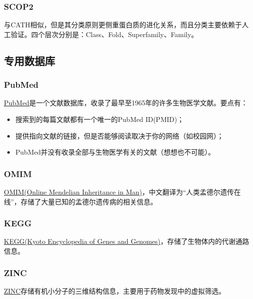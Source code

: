 \subsubsection{SCOP2}

与CATH相似，但是其分类原则更侧重蛋白质的进化关系，而且分类主要依赖于人工验证。四个层次分别是：Class、Fold、Superfamily、Family。

\subsection{专用数据库}

\subsubsection{PubMed}

\href{https://pubmed.ncbi.nlm.nih.gov/}{PubMed}是一个文献数据库，收录了最早至1965年的许多生物医学文献。要点有：

\begin{itemize}
	\item 搜索到的每篇文献都有一个唯一的PubMed ID(PMID)；
	\item 提供指向文献的链接，但是否能够阅读取决于你的网络（如校园网）；
	\item PubMed并没有收录全部与生物医学有关的文献（想想也不可能）。
\end{itemize}

\subsubsection{OMIM}

\href{https://www.omim.org/}{OMIM(Online Mendelian Inheritance in Man)}，中文翻译为“人类孟德尔遗传在线”，存储了大量已知的孟德尔遗传病的相关信息。

\subsubsection{KEGG}

\href{https://www.genome.jp/kegg/}{KEGG(Kyoto Encyclopedia of Genes and Genomes)}，存储了生物体内的代谢通路信息。

\subsubsection{ZINC}

\href{https://zinc.docking.org/}{ZINC}存储有机小分子的三维结构信息，主要用于药物发现中的虚拟筛选。

